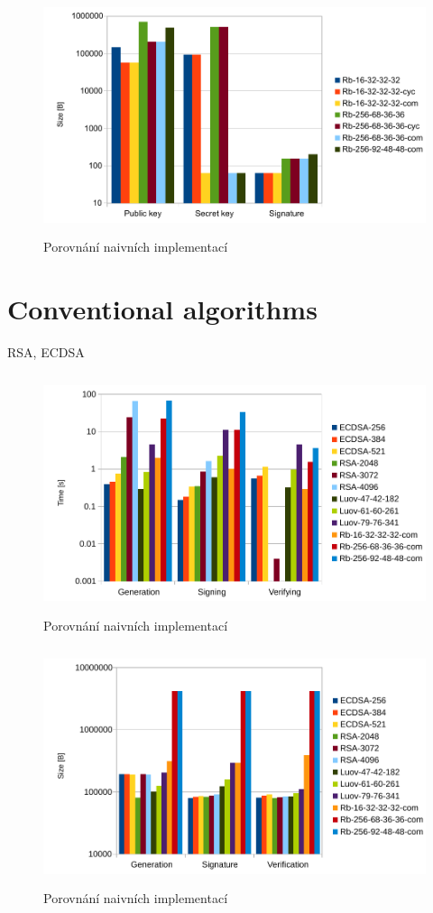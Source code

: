 \documentclass[thesis=M,english]{FITthesis}[2019/12/23]
\begin{document}
\begin{figure}[H]
\centering
\includegraphics[width=13cm,height=7cm]{images/sign-rb.pdf}
\caption{Porovnání naivních implementací}
\label{sign-rb}
\end{figure}

\section{Conventional algorithms}
RSA, ECDSA

\begin{figure}[H]
\centering
\includegraphics[width=13cm,height=7cm]{images/time-all.pdf}
\caption{Porovnání naivních implementací}
\label{time-all}
\end{figure}

\begin{figure}[H]
\centering
\includegraphics[width=13cm,height=7cm]{images/mem-all.pdf}
\caption{Porovnání naivních implementací}
\label{mem-all}
\end{figure}
\end{document}
